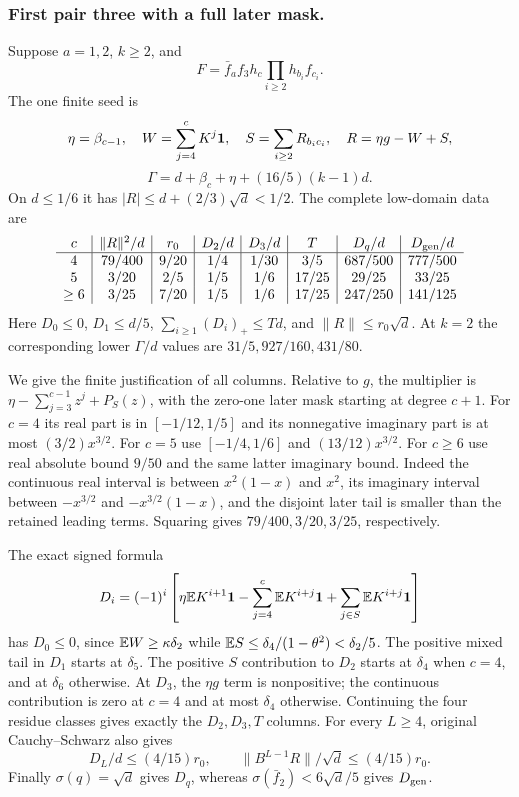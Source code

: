 \subsubsection{First pair three with a full later mask.}\label{part:unit-p:three-later}
Suppose \(a=1,2\), \(k\ge2\), and
\[
 F=\bar f_af_3h_c\prod_{i\ge2}h_{b_i}f_{c_i}.
\]
The one finite seed is
\[
 \eta=\beta_{c-1},\quad W=\sum_{j=4}^cK^j\mathbf1,\quad
 S=\sum_{i\ge2}R_{b_ic_i},\quad R=\eta g-W+S,
\]
\begin{equation}\label{eq:unit-p:data-5}
\Gamma=d+\beta_c+\eta+(16/5)(k-1)d .
\end{equation}
On \(d\le1/6\) it has \(|R|\le d+(2/3)\sqrt d<1/2\).
The complete low-domain data are
\begin{equation}\label{eq:unit-p:data-6}
\begin{array}{c|c|c|c|c|c|c|c}
 c&\|R\|^2/d&r_0&D_2/d&D_3/d&T&
             D_q/d&D_{\rm gen}/d\\\hline
 4&79/400&9/20&1/4&1/30&3/5&687/500&777/500\\
 5&3/20&2/5&1/5&1/6&17/25&29/25&33/25\\
 \ge6&3/25&7/20&1/5&1/6&17/25&247/250&141/125
\end{array}
\end{equation}
Here \(D_0\le0\), \(D_1\le d/5\),
\(\sum_{i\ge1}(D_i)_+\le Td\), and \(\|R\|\le r_0\sqrt d\).
At \(k=2\) the corresponding lower \(\Gamma/d\) values are
\(31/5,927/160,431/80\).

We give the finite justification of all columns. Relative to \(g\),
the multiplier is
\(\eta-\sum_{j=3}^{c-1}z^j+P_S(z)\), with the zero-one later
mask starting at degree \(c+1\). For \(c=4\) its real part is in
\([-1/12,1/5]\) and its nonnegative imaginary part is at most
\((3/2)x^{3/2}\). For \(c=5\) use \([-1/4,1/6]\) and
\((13/12)x^{3/2}\). For \(c\ge6\) use real absolute bound \(9/50\)
and the same latter imaginary bound. Indeed the continuous real
interval is between \(x^2(1-x)\) and \(x^2\), its imaginary interval
between \(-x^{3/2}\) and \(-x^{3/2}(1-x)\), and the disjoint
later tail is smaller than the retained leading terms.
Squaring gives \(79/400,3/20,3/25\), respectively.

The exact signed formula
\[
 D_i=(-1)^i\left[
  \eta\mathbb E K^{i+1}\mathbf1-\sum_{j=4}^c\mathbb E K^{i+j}\mathbf1
                         +\sum_{j\in S}\mathbb E K^{i+j}\mathbf1\right]
\]
has \(D_0\le0\), since \(\mathbb E W\ge\kappa\delta_2\) while
\(\mathbb E S\le\delta_4/(1-\theta^2)<\delta_2/5\).
The positive mixed tail in \(D_1\) starts at \(\delta_5\).
The positive \(S\) contribution to \(D_2\) starts at \(\delta_4\)
when \(c=4\), and at \(\delta_6\) otherwise. At \(D_3\), the
\(\eta g\) term is nonpositive; the continuous contribution is
zero at \(c=4\) and at most \(\delta_4\) otherwise.
Continuing the four residue classes gives exactly the \(D_2,D_3,T\)
columns. For every \(L\ge4\), original Cauchy--Schwarz also gives
\[
 D_L/d\le(4/15)r_0,\qquad
 \|B^{L-1}R\|/\sqrt d\le(4/15)r_0 .
\]
Finally \(\sigma(q)=\sqrt d\) gives \(D_q\), whereas
\(\sigma(\bar f_2)<6\sqrt d/5\) gives \(D_{\rm gen}\).

